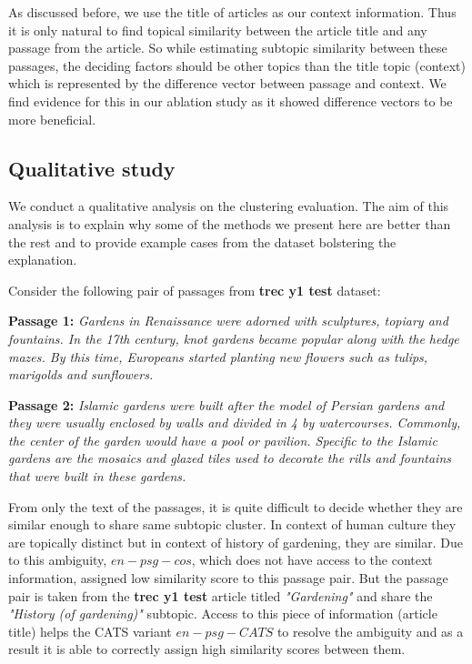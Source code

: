 As discussed before, we use the title of articles as our context information. Thus it is only natural to find topical similarity between the article title and any passage from the article. So while estimating subtopic similarity between these passages, the deciding factors should be other topics than the title topic (context) which is represented by the difference vector between passage and context. We find evidence for this in our ablation study as it showed difference vectors to be more beneficial. 

\subsection{Qualitative study} We conduct a qualitative analysis on the clustering evaluation. The aim of this analysis is to explain why some of the methods we present here are better than the rest and to provide example cases from the dataset bolstering the explanation.

Consider the following pair of passages from \textbf{trec y1 test} dataset:

\textbf{Passage 1: } \textit{Gardens in Renaissance were adorned with sculptures, topiary and fountains. In the 17th century, knot gardens became popular along with the hedge mazes. By this time, Europeans started planting new flowers such as tulips, marigolds and sunflowers.}

\textbf{Passage 2: } \textit{Islamic gardens were built after the model of Persian gardens and they were usually enclosed by walls and divided in 4 by watercourses. Commonly, the center of the garden would have a pool or pavilion. Specific to the Islamic gardens are the mosaics and glazed tiles used to decorate the rills and fountains that were built in these gardens.}

From only the text of the passages, it is quite difficult to decide whether they are similar enough to share same subtopic cluster. In context of human culture they are topically distinct but in context of history of gardening, they are similar. Due to this ambiguity, $en-psg-cos$, which does not have access to the context information, assigned low similarity score to this passage pair. But the passage pair is taken from the \textbf{trec y1 test} article titled \textit{"Gardening"} and share the \textit{"History (of gardening)"} subtopic. Access to this piece of information (article title) helps the CATS variant $en-psg-CATS$ to resolve the ambiguity and as a result it is able to correctly assign high similarity scores between them.

